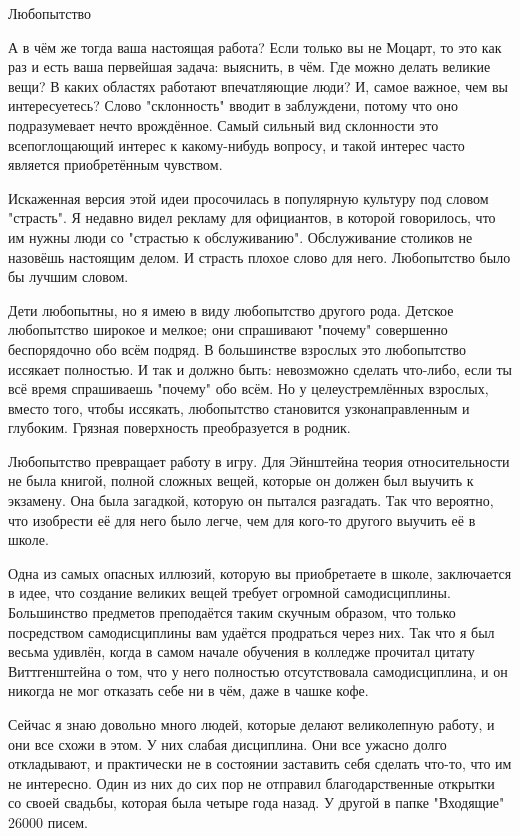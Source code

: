 \documentclass[ebook,12pt,oneside,openany]{memoir}
\begin{document}
Любопытство

А в чём же тогда ваша настоящая работа? Если только вы не Моцарт, то
это как раз и есть ваша первейшая задача: выяснить, в чём. Где можно
делать великие вещи? В каких областях работают впечатляющие люди? И,
самое важное, чем вы интересуетесь? Слово "склонность" вводит в
заблуждени, потому что оно подразумевает нечто врождённое. Самый
сильный вид склонности это всепоглощающий интерес к какому-нибудь
вопросу, и такой интерес часто является приобретённым чувством.

Искаженная версия этой идеи просочилась в популярную культуру под
словом "страсть". Я недавно видел рекламу для официантов, в которой
говорилось, что им нужны люди со "страстью к обслуживанию".
Обслуживание столиков не назовёшь настоящим делом. И страсть плохое
слово для него. Любопытство было бы лучшим словом.

Дети любопытны, но я имею в виду любопытство другого рода. Детское
любопытство широкое и мелкое; они спрашивают "почему" совершенно
беспорядочно обо всём подряд. В большинстве взрослых это любопытство
иссякает полностью. И так и должно быть: невозможно сделать что-либо,
если ты всё время спрашиваешь "почему" обо всём. Но у целеустремлённых
взрослых, вместо того, чтобы иссякать, любопытство становится
узконаправленным и глубоким. Грязная поверхность преобразуется в
родник.

Любопытство превращает работу в игру. Для Эйнштейна теория
относительности не была книгой, полной сложных вещей, которые он
должен был выучить к экзамену. Она была загадкой, которую он пытался
разгадать. Так что вероятно, что изобрести её для него было легче, чем
для кого-то другого выучить её в школе.

Одна из самых опасных иллюзий, которую вы приобретаете в школе,
заключается в идее, что создание великих вещей требует огромной
самодисциплины. Большинство предметов преподаётся таким скучным
образом, что только посредством самодисциплины вам удаётся продраться
через них. Так что я был весьма удивлён, когда в самом начале обучения
в колледже прочитал цитату Виттгенштейна о том, что у него полностью
отсутствовала самодисциплина, и он никогда не мог отказать себе ни в
чём, даже в чашке кофе.

Сейчас я знаю довольно много людей, которые делают великолепную
работу, и они все схожи в этом. У них слабая дисциплина. Они все
ужасно долго откладывают, и практически не в состоянии заставить себя
сделать что-то, что им не интересно. Один из них до сих пор не
отправил благодарственные открытки со своей свадьбы, которая была
четыре года назад. У другой в папке "Входящие" 26000 писем.
\end{document}
